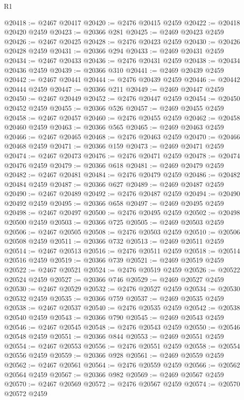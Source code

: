 \begin{lexlean}{R1}
\begin{coremodule}
@20418 := @2467 @20417
@20420 := @2476 @20415 @2459
@20422 := @20418 @20420 @2459
@20423 := @20366 @281
@20425 := @2469 @20423 @2459
@20426 := @2467 @20425
@20428 := @2476 @20423 @2459
@20430 := @20426 @20428 @2459
@20431 := @20366 @294
@20433 := @2469 @20431 @2459
@20434 := @2467 @20433
@20436 := @2476 @20431 @2459
@20438 := @20434 @20436 @2459
@20439 := @20366 @310
@20441 := @2469 @20439 @2459
@20442 := @2467 @20441
@20444 := @2476 @20439 @2459
@20446 := @20442 @20444 @2459
@20447 := @20366 @211
@20449 := @2469 @20447 @2459
@20450 := @2467 @20449
@20452 := @2476 @20447 @2459
@20454 := @20450 @20452 @2459
@20455 := @20366 @526
@20457 := @2469 @20455 @2459
@20458 := @2467 @20457
@20460 := @2476 @20455 @2459
@20462 := @20458 @20460 @2459
@20463 := @20366 @565
@20465 := @2469 @20463 @2459
@20466 := @2467 @20465
@20468 := @2476 @20463 @2459
@20470 := @20466 @20468 @2459
@20471 := @20366 @159
@20473 := @2469 @20471 @2459
@20474 := @2467 @20473
@20476 := @2476 @20471 @2459
@20478 := @20474 @20476 @2459
@20479 := @20366 @618
@20481 := @2469 @20479 @2459
@20482 := @2467 @20481
@20484 := @2476 @20479 @2459
@20486 := @20482 @20484 @2459
@20487 := @20366 @627
@20489 := @2469 @20487 @2459
@20490 := @2467 @20489
@20492 := @2476 @20487 @2459
@20494 := @20490 @20492 @2459
@20495 := @20366 @658
@20497 := @2469 @20495 @2459
@20498 := @2467 @20497
@20500 := @2476 @20495 @2459
@20502 := @20498 @20500 @2459
@20503 := @20366 @725
@20505 := @2469 @20503 @2459
@20506 := @2467 @20505
@20508 := @2476 @20503 @2459
@20510 := @20506 @20508 @2459
@20511 := @20366 @732
@20513 := @2469 @20511 @2459
@20514 := @2467 @20513
@20516 := @2476 @20511 @2459
@20518 := @20514 @20516 @2459
@20519 := @20366 @739
@20521 := @2469 @20519 @2459
@20522 := @2467 @20521
@20524 := @2476 @20519 @2459
@20526 := @20522 @20524 @2459
@20527 := @20366 @746
@20529 := @2469 @20527 @2459
@20530 := @2467 @20529
@20532 := @2476 @20527 @2459
@20534 := @20530 @20532 @2459
@20535 := @20366 @759
@20537 := @2469 @20535 @2459
@20538 := @2467 @20537
@20540 := @2476 @20535 @2459
@20542 := @20538 @20540 @2459
@20543 := @20366 @790
@20545 := @2469 @20543 @2459
@20546 := @2467 @20545
@20548 := @2476 @20543 @2459
@20550 := @20546 @20548 @2459
@20551 := @20366 @844
@20553 := @2469 @20551 @2459
@20554 := @2467 @20553
@20556 := @2476 @20551 @2459
@20558 := @20554 @20556 @2459
@20559 := @20366 @928
@20561 := @2469 @20559 @2459
@20562 := @2467 @20561
@20564 := @2476 @20559 @2459
@20566 := @20562 @20564 @2459
@20567 := @20366 @982
@20569 := @2469 @20567 @2459
@20570 := @2467 @20569
@20572 := @2476 @20567 @2459
@20574 := @20570 @20572 @2459

\end{coremodule}
\end{lexlean}
